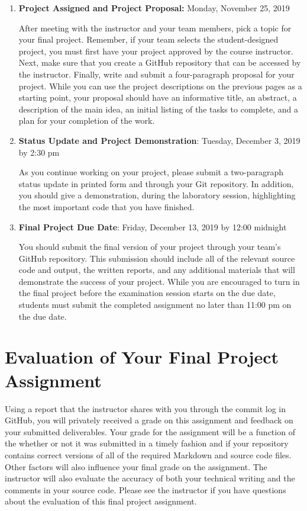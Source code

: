 \documentclass[11pt]{article}
\begin{document}
\begin{enumerate}

  \item {\bf Project Assigned and Project Proposal:} Monday, November 25, 2019

    After meeting with the instructor and your team members, pick a topic for
    your final project. Remember, if your team selects the student-designed
    project, you must first have your project approved by the course
    instructor. Next, make sure that you create a GitHub repository that can be
    accessed by the instructor. Finally, write and submit a four-paragraph
    proposal for your project. While you can use the project descriptions on
    the previous pages as a starting point, your proposal should have an
    informative title, an abstract, a description of the main idea, an initial
    listing of the tasks to complete, and a plan for your completion of the
    work.

  \item {\bf Status Update and Project Demonstration}: Tuesday, December 3, 2019
    by 2:30 pm

    As you continue working on your project, please submit a two-paragraph
    status update in printed form and through your Git repository. In addition,
    you should give a demonstration, during the laboratory session, highlighting
    the most important code that you have finished.

  \item {\bf Final Project Due Date}: Friday, December 13, 2019 by 12:00 midnight

    You should submit the final version of your project through your team's
    GitHub repository. This submission should include all of the relevant source
    code and output, the written reports, and any additional materials that will
    demonstrate the success of your project. While you are encouraged to turn in
    the final project before the examination session starts on the due date,
    students must submit the completed assignment no later than 11:00 pm on the
    due date.

\end{enumerate}

\section*{Evaluation of Your Final Project Assignment}

Using a report that the instructor shares with you through the commit log in
GitHub, you will privately received a grade on this assignment and feedback on
your submitted deliverables. Your grade for the assignment will be a function of
the whether or not it was submitted in a timely fashion and if your repository
contains correct versions of all of the required Markdown and source code files.
Other factors will also influence your final grade on the assignment. The
instructor will also evaluate the accuracy of both your technical writing and
the comments in your source code. Please see the instructor if you have
questions about the evaluation of this final project assignment.
\end{document}
